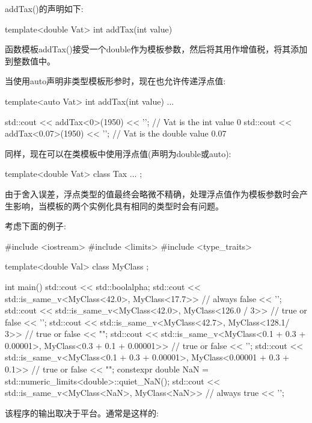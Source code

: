 addTax()的声明如下:

\begin{cpp}
template<double Vat>
int addTax(int value)
\end{cpp}

函数模板addTax()接受一个double作为模板参数，然后将其用作增值税，将其添加到整数值中。

当使用auto声明非类型模板形参时，现在也允许传递浮点值:

\begin{cpp}
template<auto Vat>
int addTax(int value)
{
	...
}

std::cout << addTax<0>(1950) << '\n'; // Vat is the int value 0
std::cout << addTax<0.07>(1950) << '\n'; // Vat is the double value 0.07
\end{cpp}

同样，现在可以在类模板中使用浮点值(声明为double或auto):

\begin{cpp}
template<double Vat>
class Tax {
	...
};
\end{cpp}


由于舍入误差，浮点类型的值最终会略微不精确，处理浮点值作为模板参数时会产生影响，当模板的两个实例化具有相同的类型时会有问题。

考虑下面的例子:


\begin{cpp}
#include <iostream>
#include <limits>
#include <type_traits>

template<double Val>
class MyClass {
};

int main()
{
	std::cout << std::boolalpha;
	std::cout << std::is_same_v<MyClass<42.0>, MyClass<17.7>> // always false
			  << '\n';
	std::cout << std::is_same_v<MyClass<42.0>, MyClass<126.0 / 3>> // true or false
			  << '\n';
	std::cout << std::is_same_v<MyClass<42.7>, MyClass<128.1/ 3>> // true or false
			  << "\n\n";
	std::cout << std::is_same_v<MyClass<0.1 + 0.3 + 0.00001>,
	MyClass<0.3 + 0.1 + 0.00001>> // true or false
			  << '\n';
	std::cout << std::is_same_v<MyClass<0.1 + 0.3 + 0.00001>,
	MyClass<0.00001 + 0.3 + 0.1>> // true or false
			  << "\n\n";
	constexpr double NaN = std::numeric_limits<double>::quiet_NaN();
	std::cout << std::is_same_v<MyClass<NaN>, MyClass<NaN>> // always true
			  << '\n';
}
\end{cpp}

该程序的输出取决于平台。通常是这样的:

